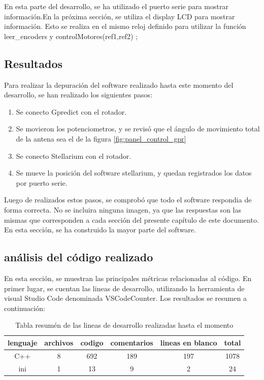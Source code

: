 En esta parte del desarrollo, se ha utilizado el puerto serie para mostrar información.En la próxima sección, se utiliza el display LCD para mostrar información. Esto se realiza en el mismo reloj definido para utilizar la función leer\_encoders y controlMotores(ref1,ref2) ; 

\subsection{Resultados}
Para realizar la depuración del software realizado hasta este momento del desarrollo, se han realizado los siguientes pasos: 
\begin{enumerate}
	\item Se conecto Gpredict con el rotador. 
	\item Se movieron los potenciometros, y se revisó que el ángulo de movimiento total de la antena sea el de la figura \ref{fig:panel_control_gpr}
	\item Se conecto Stellarium con el rotador.
	\item Se mueve la posición del software stellarium, y quedan registrados los datos por puerto serie.
\end{enumerate}


Luego de realizados estos pasos, se comprobó que todo el software respondia de forma correcta. No se incluira ninguna imagen, ya que las respuestas son las mismas que corresponden a cada sección del presente capítulo de este documento. En esta sección, se ha construido la mayor parte del software. 


\subsection{análisis del código realizado}

En esta sección, se muestran las principales métricas relacionadas al código. 
En primer lugar, se cuentan las lineas de desarrollo, utilizando la herramienta de visual Studio Code denominada VSCodeCounter. Los resultados se resumen a continuación: 
\begin{table}[ht]
	\centering
	\begin{tabular}{|c|c|c|c|c|c|}
		\hline 
		lenguaje& archivos & codigo & comentarios & lineas en blanco & total \\ 
		\hline 
		C++ & 8 &692 &189 &197 & 1078 \\
		\hline 
		ini &1 &13 &9 &2&24\\
		\hline
	\end{tabular}
\caption{Tabla resumén de las lineas de desarrollo realizadas hasta el momento}
\end{table}

